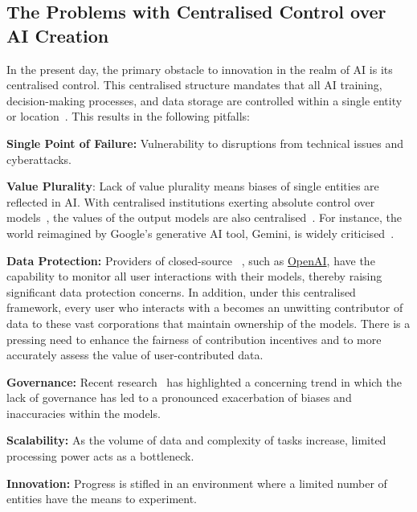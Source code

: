 \documentclass[conference]{IEEEtran}
\begin{document}
\subsection{The Problems with Centralised Control over AI Creation}
In the present day, the primary obstacle to innovation in the realm of AI is its centralised control. This centralised structure mandates that all AI training, decision-making processes, and data storage are controlled within a single entity or location~\cite{bellavista2021decentralised}. 
This results in the following pitfalls:
\begin{description}
    \item \textbf{Single Point of Failure:} Vulnerability to disruptions from technical issues and cyberattacks.
    \item \textbf{Value Plurality}: Lack of value plurality means biases of single entities are reflected in AI. With centralised institutions exerting absolute control over models~\cite{wu2023brief, shen2024hugginggpt}, the values of the output models are also centralised~\cite{anil2023palm}. For instance, the world reimagined by Google’s generative AI tool, Gemini, is widely criticised~\cite{gemini-wont-show-you-white-people}.

    \item \textbf{Data Protection:} Providers of closed-source \LLMs~\cite{zhao2023survey}, such as \href{https://openai.com/}{OpenAI}, have the capability to monitor all user interactions with their models, thereby raising significant data protection concerns. In addition, under this centralised framework, every user who interacts with a \LLM becomes an unwitting contributor of data to these vast corporations that maintain ownership of the models. There is a pressing need to enhance the fairness of contribution incentives and to more accurately assess the value of user-contributed data.

    \item \textbf{Governance:} Recent research~\cite{nist-report,IBM-report,MIT-report} has highlighted a concerning trend in which the lack of governance has led to a pronounced exacerbation of biases and inaccuracies within the models.

    \item \textbf{Scalability:} As the volume of data and complexity of tasks increase, limited processing power acts as a bottleneck.

    \item \textbf{Innovation:} Progress is stifled in an environment where a limited number of entities have the means to experiment.
\end{description}
\end{document}
